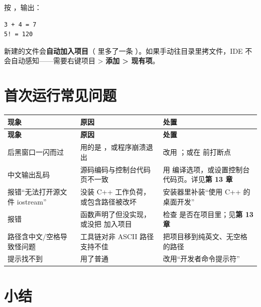 按 ，输出：

\begin{lstlisting}[style=textstyle]
3 + 4 = 7
5! = 120
\end{lstlisting}

\begin{tipbox}[提示]
新建的文件会\textbf{自动加入项目}（ 里多了一条 ）。如果手动往目录里拷文件，IDE 不会自动感知——需要右键项目 > \textbf{添加 > 现有项}。
\end{tipbox}

\section{首次运行常见问题}

\begin{longtable}{L{4.6cm}L{4.6cm}L{5.4cm}}\toprule
\textbf{现象} & \textbf{原因} & \textbf{处置} \\ \midrule \endfirsthead
\toprule \textbf{现象} & \textbf{原因} & \textbf{处置} \\ \midrule \endhead
\bottomrule \endlastfoot
{} 后黑窗口一闪而过 & 用的是 ，或程序崩溃退出 & 改用 ；或在  前打断点 \\
中文输出乱码 & 源码编码与控制台代码页不一致 & 用  编译选项，或设置控制台代码页。详见\textbf{第 13 章} \\
报错“无法打开源文件 iostream” & 没装 C++ 工作负荷，或包含路径被改坏 & 安装器里补装“使用 C++ 的桌面开发” \\
报错  & 函数声明了但没实现，或没把  加入项目 & 检查  是否在项目里；见\textbf{第 13 章} \\
路径含中文/空格导致怪问题 & 工具链对非 ASCII 路径支持不佳 & 把项目移到纯英文、无空格的路径 \\
提示找不到  & 用了普通  & 改用“开发者命令提示符” \\
\end{longtable}

\section{小结}

